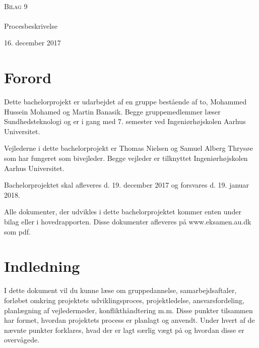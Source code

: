 


\begin{titlingpage}
\begin{center}

~ \\[3cm]


\textsc{\LARGE Bilag 9}\\[1.5cm]


\noindent\makebox[\linewidth]{\rule{\textwidth}{0.4pt}}\\
[0.5cm]{\Huge Procesbeskrivelse}
\noindent\makebox[\linewidth]{\rule{\textwidth}{0.4pt}}
\end{center}
\vfill
\begin{center}
{\large 16. december 2017}
\end{center}
\end{titlingpage}

\newpage
\tableofcontents

\chapter{Forord} 

Dette bachelorprojekt er udarbejdet af en gruppe bestående af to, Mohammed Hussein Mohamed og Martin Banasik. Begge gruppemedlemmer læser Sundhedsteknologi og er i gang med 7. semester ved Ingeniørhøjskolen Aarhus Universitet.

Vejlederne i dette bachelorprojekt er Thomas Nielsen og Samuel Alberg Thrysøe som har fungeret som bivejleder. Begge vejleder er tilknyttet Ingeniørhøjskolen Aarhus Universitet.

Bachelorprojektet skal afleveres d. 19. december 2017 og forsvares d. 19. januar 2018.

Alle dokumenter, der udvikles i dette  bachelorprojektet kommer enten under bilag eller i hovedrapporten. Disse dokumenter afleveres på  www.eksamen.au.dk som pdf. 



\chapter{Indledning}
I dette dokument vil du kunne læse om gruppedannelse, samarbejdsaftaler, forløbet omkring projektets udviklingsproces, projektledelse, ansvarsfordeling, planlægning af vejledermøder, konflikthåndtering m.m. Disse punkter tilsammen har formet, hvordan projektets process er planlagt og anvendt. Under hvert af de nævnte punkter forklares, hvad der er lagt særlig vægt på og hvordan  disse er overvågede. 



